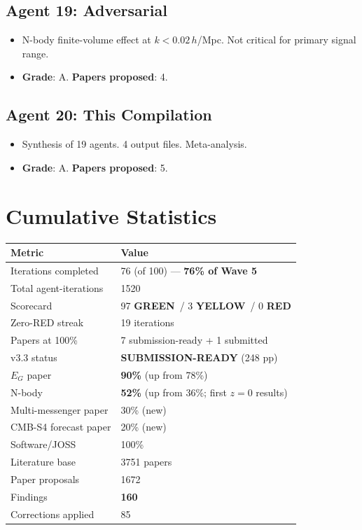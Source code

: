 \documentclass[11pt,a4paper]{article}
\newcommand{\GREEN}{\textcolor{dfdgreen}{\textbf{GREEN}}}
\newcommand{\YELLOW}{\textcolor{dfdyellow}{\textbf{YELLOW}}}
\newcommand{\RED}{\textcolor{dfdred}{\textbf{RED}}}
\begin{document}
\subsection{Agent 19: Adversarial}
\begin{itemize}[nosep]
\item N-body finite-volume effect at $k < 0.02\,h$/Mpc. Not critical for primary signal range.
\item \textbf{Grade}: A. \textbf{Papers proposed}: 4.
\end{itemize}

\subsection{Agent 20: This Compilation}
\begin{itemize}[nosep]
\item Synthesis of 19 agents. 4 output files. Meta-analysis.
\item \textbf{Grade}: A. \textbf{Papers proposed}: 5.
\end{itemize}

\section{Cumulative Statistics}

\begin{center}
\begin{tabular}{ll}
\toprule
\textbf{Metric} & \textbf{Value} \\
\midrule
Iterations completed & 76 (of 100) --- \textbf{76\% of Wave 5} \\
Total agent-iterations & 1520 \\
Scorecard & 97 \GREEN\ / 3 \YELLOW\ / 0 \RED \\
Zero-RED streak & 19 iterations \\
Papers at 100\% & 7 submission-ready + 1 submitted \\
v3.3 status & \textbf{SUBMISSION-READY} (248 pp) \\
$E_G$ paper & \textbf{90\%} (up from 78\%) \\
N-body & \textbf{52\%} (up from 36\%; first $z=0$ results) \\
Multi-messenger paper & 30\% (new) \\
CMB-S4 forecast paper & 20\% (new) \\
Software/JOSS & 100\% \\
Literature base & 3751 papers \\
Paper proposals & 1672 \\
Findings & \textbf{160} \\
Corrections applied & 85 \\
\bottomrule
\end{tabular}
\end{center}
\end{document}
